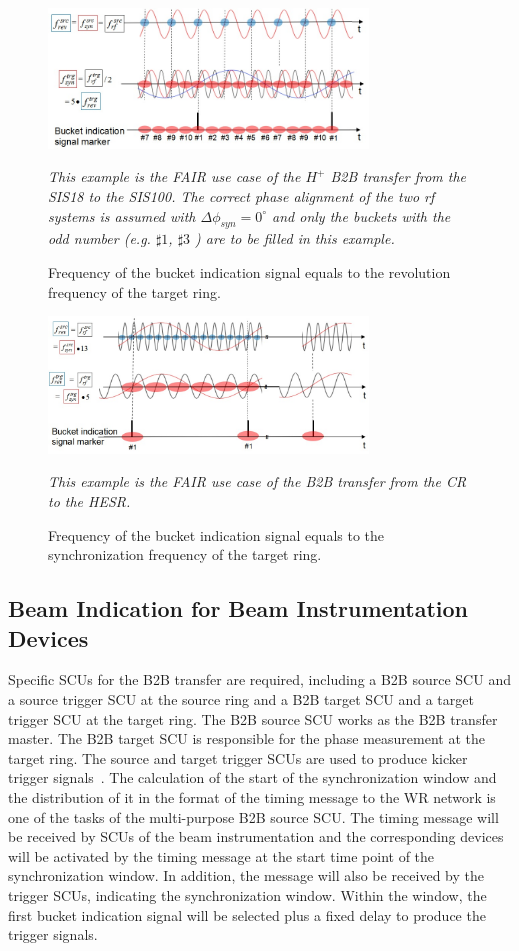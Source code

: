 \begin{figure}[!htb]
   \centering   
   \includegraphics*[width=85mm]{bucket_label_occurrence.jpg}
   \caption{Frequency of the bucket indication signal equals to the revolution frequency of the target ring.}
	{\textsl{\small{This example is the FAIR use case of the $H^+$ B2B transfer from the SIS18 to the SIS100. The correct phase alignment of the two rf systems is assumed with $\Delta\phi_\mathit{syn}=0^\circ$ and only the buckets with the odd number (e.g. $\sharp1$, $\sharp3$ ) are to be filled in this example.}}}
   \label{bucket_label_occurrence}
\end{figure}

\begin{figure}[!htb]
   \centering   
   \includegraphics*[width=85mm]{bucket_label_occurrence1.jpg}
   \caption{Frequency of the bucket indication signal equals to the synchronization frequency of the target ring.}
	{\textsl{\small{This example is the FAIR use case of the B2B transfer from the CR to the HESR. }}}
   \label{bucket_label_occurrence1}
\end{figure}

\subsection{Beam Indication for Beam Instrumentation Devices}
\label{beam_indi}
Specific SCUs for the B2B transfer are required, including a B2B source SCU and a source trigger SCU at the source ring and a B2B target SCU and a target trigger SCU at the target ring. The B2B source SCU works as the B2B transfer master. The B2B target SCU is responsible for the phase measurement at the target ring. The source and target trigger SCUs are used to produce kicker trigger signals~\cite{bai_f-tc-c-05_2016}. The calculation of the start of the synchronization window and the distribution of it in the format of the timing message to the WR network is one of the tasks of the multi-purpose B2B source SCU. The timing message will be received by SCUs of the beam instrumentation and the corresponding devices will be activated by the timing message at the start time point of the synchronization window. In addition, the message will also be received by the trigger SCUs, indicating the synchronization window. Within the window, the first bucket indication signal will be selected plus a fixed delay to produce the trigger signals.
